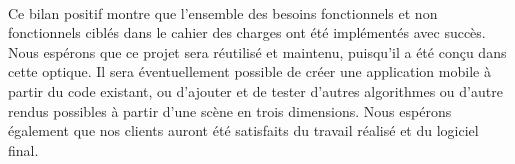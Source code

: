 \paragraph{}
Ce bilan positif montre que l'ensemble des besoins fonctionnels et non fonctionnels ciblés dans le cahier des charges ont été implémentés avec succès. Nous espérons que ce projet sera réutilisé et maintenu, puisqu'il a été conçu dans cette optique. Il sera éventuellement possible de créer une application mobile à partir du code existant, ou d'ajouter et de tester d'autres algorithmes ou d'autre rendus possibles à partir d'une scène en trois dimensions. Nous espérons également que nos clients auront été satisfaits du travail réalisé et du logiciel final. 

